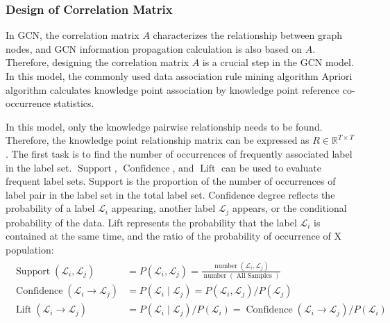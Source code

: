 \subsubsection{Design of Correlation Matrix}


In GCN, the correlation matrix \(A\) characterizes the relationship between graph nodes, and GCN information propagation calculation is also based on \(A\). Therefore, designing the correlation matrix \(A\) is a crucial step in the GCN model. In this model, the commonly used data association rule mining algorithm Apriori algorithm calculates knowledge point association by knowledge point reference co-occurrence statistics.

In this model, only the knowledge pairwise relationship needs to be found. Therefore, the knowledge point relationship matrix can be expressed as \(R\in \mathbb{R}^{T\times T}\). The first task is to find the number of occurrences of frequently associated label in the label set. \(\operatorname{Support}\), \(\operatorname{Confidence}\), and \(\operatorname{Lift}\) can be used to evaluate frequent label sets. Support is the proportion of the number of occurrences of label pair in the label set in the total label set. Confidence degree reflects the probability of a label \(\mathcal{L}_i\) appearing, another label \(\mathcal{L}_j\) appears, or the conditional probability of the data. Lift represents the probability that the label \(\mathcal{L}_i\) is contained at the same time, and the ratio of the probability of occurrence of X population:
\begin{align}
	\begin{split}
		\operatorname{Support}(\mathcal{L}_i, \mathcal{L}_j)       & =P(\mathcal{L}_i,\mathcal{L}_j)=\frac{\operatorname{number}(\mathcal{L}_i,\mathcal{L}_j)}{\operatorname{number}(\text{ All Samples })} \\
		\operatorname{Confidence}(\mathcal{L}_i \to \mathcal{L}_j) & =P(\mathcal{L}_i \mid \mathcal{L}_j)=P(\mathcal{L}_i, \mathcal{L}_j) / P(\mathcal{L}_j)                                                \\
		\operatorname{Lift}(\mathcal{L}_i \to \mathcal{L}_j)       & =P(\mathcal{L}_i \mid \mathcal{L}_j) / P(\mathcal{L}_i)=\operatorname{Confidence}(\mathcal{L}_i \to \mathcal{L}_j) / P(\mathcal{L}_i)
	\end{split}
\end{align}

